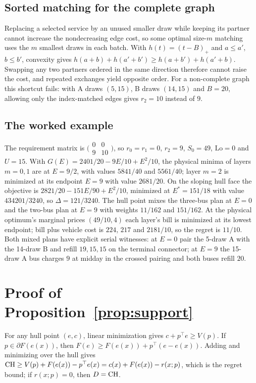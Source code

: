 \subsection{Sorted matching for the complete graph}
Replacing a selected service by an unused smaller draw while keeping its partner
cannot increase the nondecreasing edge cost, so some optimal size-$m$ matching
uses the $m$ smallest draws in each batch. With $h(t)=(t-B)_+$ and $a\le a'$,
$b\le b'$, convexity gives $h(a+b)+h(a'+b')\ge h(a+b')+h(a'+b)$. Swapping any
two partners ordered in the same direction therefore cannot raise the cost, and
repeated exchanges yield opposite order. For a non-complete graph this shortcut
fails: with A draws $(5,15)$, B draws $(14,15)$ and $B=20$, allowing only the
index-matched edges gives $r_2=10$ instead of $9$.

\subsection{The worked example}
The requirement matrix is $\bigl(\begin{smallmatrix}0&0\\9&10\end{smallmatrix}\bigr)$,
so $r_0=r_1=0$, $r_2=9$, $S_0=49$, $\mathrm{Lo}=0$ and $U=15$. With
$G(E)=2401/20-9E/10+E^2/10$, the physical minima of layers $m=0,1$ are at $E=9/2$,
with values $5841/40$ and $5561/40$; layer $m=2$ is minimized at its endpoint
$E=9$ with value $2681/20$. On the sloping hull face the objective is
$2821/20-151E/90+E^2/10$, minimized at $E^*=151/18$ with value $434201/3240$, so
$\Delta=121/3240$. The hull point mixes the three-bus plan at $E=0$ and the
two-bus plan at $E=9$ with weights $11/162$ and $151/162$. At the physical
optimum's marginal prices $(49/10,4)$ each layer's bill is minimized at its lowest
endpoint; bill plus vehicle cost is $224$, $217$ and $2181/10$, so the regret is
$11/10$. Both mixed plans have explicit serial witnesses: at $E=0$ pair the 5-draw
A with the 14-draw B and refill $19,15,15$ on the terminal connector; at $E=9$ the
15-draw A bus charges $9$ at midday in the crossed pairing and both buses refill
$20$.

\section{Proof of Proposition~\ref{prop:support}}\label{app:support}
For any hull point $(e,c)$, linear minimization gives $c+p^\top e\ge V(p)$. If
$p\in\partial F(e(x))$, then $F(e)\ge F(e(x))+p^\top(e-e(x))$. Adding and
minimizing over the hull gives $\mathrm{CH}\ge V(p)+F(e(x))-p^\top e(x)=c(x)+F(e(x))-r(x;p)$,
which is the regret bound; if $r(x;p)=0$, then $D=\mathrm{CH}$.

